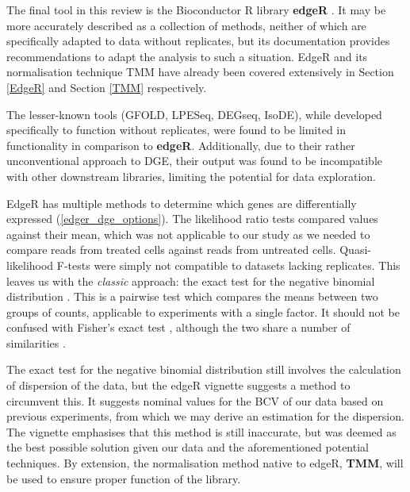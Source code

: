 The final tool in this review is the Bioconductor R library \textbf{edgeR} \citep{edger}. It may be more accurately described as a collection of methods, neither of which are specifically adapted to data without replicates, but its documentation provides recommendations to adapt the analysis to such a situation. EdgeR and its normalisation technique \ac{TMM} have already been covered extensively in Section \ref{EdgeR} and Section \ref{TMM} respectively. 

The lesser-known tools (GFOLD, LPESeq, DEGseq, IsoDE), while developed specifically to function without replicates, were found to be limited in functionality in comparison to \textbf{edgeR}. Additionally, due to their rather unconventional approach to \ac{DGE}, their output was found to be incompatible with other downstream libraries, limiting the potential for data exploration. 

EdgeR has multiple methods to determine which genes are differentially expressed (\autoref{edger_dge_options}). The likelihood ratio tests \citep{mccarthy2012differential} compared values against their mean, which was not applicable to our study as we needed to compare reads from treated cells against reads from untreated cells. Quasi-likelihood F-tests \citep{lun2016s, lund2012detecting} were simply not compatible to datasets lacking replicates. This leaves us with the \textit{classic} approach: the exact test for the negative binomial distribution \citep{robinson2007moderated, robinson2008small}. This is a pairwise test which compares the means between two groups of counts, applicable to experiments with a single factor. It should not be confused with Fisher's exact test \citep{fisher1922interpretation}, although the two share a number of similarities \citep{chen2014edger}.

The exact test for the negative binomial distribution still involves the calculation of dispersion of the data, but the edgeR vignette suggests a method to circumvent this. It suggests nominal values for the \ac{BCV} of our data based on previous experiments, from which we may derive an estimation for the dispersion. The vignette emphasises that this method is still inaccurate, but was deemed as the best possible solution given our data and the aforementioned potential techniques. By extension, the normalisation method native to edgeR, \textbf{TMM}, will be used to ensure proper function of the library.

